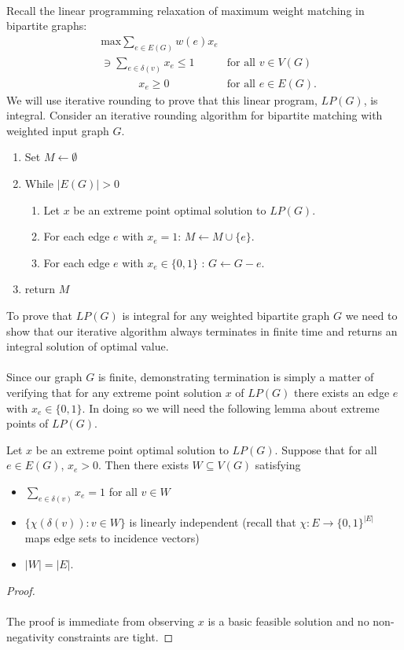 \paragraph{}
Recall the linear programming relaxation of maximum weight matching in bipartite graphs:
\begin{align*}
	&\text{max} \sum_{e \in E(G)} w(e) x_e \\
	&\ni \sum_{e \in \delta(v)} x_e \leq 1 &\text{for all $v \in V(G)$} \\
	&\quad\quad\quad\ \ x_e \geq 0 &\text{for all $e \in E(G)$.}
\end{align*}
We will use iterative rounding to prove that this linear program, $LP(G)$, is integral. Consider an iterative rounding algorithm for bipartite matching with weighted input graph $G$.
\begin{enumerate}
\item Set $M \leftarrow \emptyset$
\item While $|E(G)| > 0$\begin{enumerate}
\item Let $x$ be an extreme point optimal solution to $LP(G)$.
\item For each edge $e$ with $x_e = 1$: $M \leftarrow M \cup \{e\}$.
\item For each edge $e$ with $x_e \in \{0,1\}$ : $G \leftarrow G - e$.
\end{enumerate}
\item return $M$
\end{enumerate}
To prove that $LP(G)$ is integral for any weighted bipartite graph $G$ we need to show that our iterative algorithm always terminates in finite time and returns an integral solution of optimal value.
\paragraph{} Since our graph $G$ is finite, demonstrating termination is simply a matter of verifying that for any extreme point solution $x$ of $LP(G)$ there exists an edge $e$ with $x_e \in \{0,1\}$. In doing so we will need the following lemma about extreme points of $LP(G)$.
\begin{lemma} Let $x$ be an extreme point optimal solution to $LP(G)$. Suppose that for all $e \in E(G)$, $x_e > 0$. Then there exists $W \subseteq V(G)$ satisfying
\begin{itemize}
\item $\sum_{e\in\delta(v)} x_e = 1$ for all $v \in W$ \\
\item $\{\chi(\delta(v)) : v \in W\}$ is linearly independent (recall that $\chi : E \rightarrow \{0,1\}^{|E|}$ maps edge sets to incidence vectors)
\item $|W| = |E|$.
\end{itemize} 
\end{lemma}
\begin{proof}
\paragraph{}
The proof is immediate from observing $x$ is a basic feasible solution and no non-negativity constraints are tight.
\end{proof}

